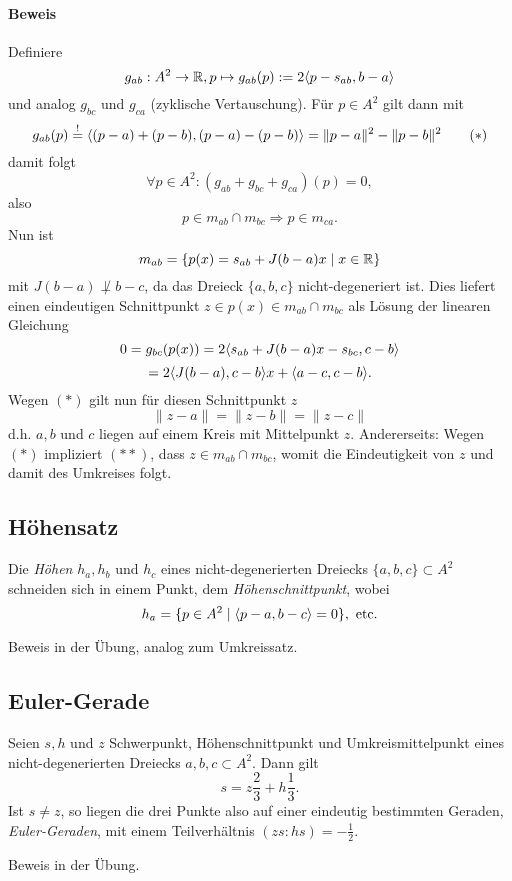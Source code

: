 \paragraph{Beweis}
	Definiere
		\[ g_{ab} : A^2\to \mathbb{R}, p\mapsto g_{ab}(p):= 2\langle p-s_{ab},b-a \rangle \]
	und analog $ g_{bc} $ und $ g_{ca} $ (zyklische Vertauschung).
	Für $ p\in A^2 $ gilt dann mit
		\[ g_{ab}(p) \overset{!}{=} \langle (p-a)+(p-b),(p-a)-(p-b) \rangle  = \|p-a\|^2-\|p-b\|^2 \tag{$ * $} \]
	damit folgt
		\[ \forall p\in A^2: (g_{ab}+g_{bc}+g_{ca})(p) = 0, \]
	also
		\[ p\in m_{ab}\cap m_{bc} \Rightarrow p\in m_{ca}. \]
	Nun ist
		\[ m_{ab} = \{p(x) = s_{ab}+J(b-a)x\mid x\in \mathbb{R}\} \]
	mit $ J(b-a)\not\perp b-c $, da das Dreieck $ \{a,b,c\} $ nicht-degeneriert ist. Dies liefert einen eindeutigen Schnittpunkt $ z\in p(x)\in m_{ab}\cap m_{bc} $ als Lösung der linearen Gleichung
		\[ 0 = g_{bc}(p(x)) = 2\langle s_{ab}+J(b-a)x-s_{bc},c-b \rangle \]
		\[ = 2\langle J(b-a),c-b \rangle x+\langle a-c,c-b \rangle. \]
	Wegen $ (*) $ gilt nun für diesen Schnittpunkt $ z $
		\[ \|z-a\| = \|z-b\| = \|z-c\| \tag{$ ** $} \]
	d.h. $ a,b $ und $ c $ liegen auf einem Kreis mit Mittelpunkt $ z $.
	Andererseits: Wegen $ (*) $ impliziert $ (**) $, dass $ z\in m_{ab}\cap m_{bc} $, womit die Eindeutigkeit von $ z $ und damit des Umkreises folgt.

\subsection{Höhensatz}
\begin{Satz}[Höhensatz]
	Die \emph{Höhen} $ h_a,h_b $ und $ h_c $ eines nicht-degenerierten Dreiecks $ \{a,b,c\} \subset A^2 $ schneiden sich in einem Punkt, dem \emph{Höhenschnittpunkt}, wobei
		\[ h_a = \{p\in A^2\mid \langle p-a,b-c \rangle = 0 \},\text{ etc.} \]
\end{Satz}
	Beweis in der Übung, analog zum Umkreissatz.

\subsection{Euler-Gerade}
\begin{Satz}
	Seien $ s, h $ und $ z $ Schwerpunkt, Höhenschnittpunkt und Umkreismittelpunkt eines nicht-degenerierten Dreiecks $ a,b,c\subset A^2 $.
	Dann gilt
		\[ s=z\frac{2}{3}+h\frac{1}{3}. \]
	Ist $ s\neq z $, so liegen die drei Punkte also auf einer eindeutig bestimmten Geraden, \emph{Euler-Geraden}, mit einem Teilverhältnis $ (zs:hs)=-\frac{1}{2} $.
\end{Satz}
	Beweis in der Übung.

